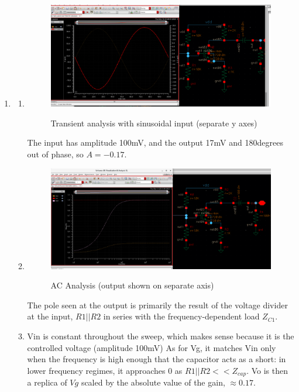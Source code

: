 \documentclass{article}
\begin{document}
\begin{prob}
\begin{enumerate}
\item
	\begin{enumerate}
		\item \begin{figure}[h]
			\includegraphics[width =\textwidth]{hw4 files/p1transanalysis.png}
			\label{transanal}
			\caption{Transient analysis with sinusoidal input (separate y axes)}
		\end{figure}
	The input has amplitude 100mV, and the output 17mV and 180degrees out of phase, so $A=-0.17$.	
\item
	\begin{figure}[h]
		\includegraphics[width =\textwidth]{hw4 files/acanalysis3.png}
		\label{acanal}
		\caption{AC Analysis (output shown on separate axis)}
	\end{figure}
The pole seen at the output is primarily the result of the voltage divider at the input, $R1||R2$ in series with the frequency-dependent load $Z_{C1}$. 
\item Vin is constant throughout the sweep, which makes sense because it is the controlled voltage (amplitude 100mV)
	As for Vg, it matches Vin only when the frequency is high enough that the capacitor acts as a short: in lower frequency regimes, it approaches 0 as $R1||R2 << Z_{cap}$.
	Vo is then a replica of $Vg$ scaled by the absolute value of the gain, $\approx0.17$.
	\end{enumerate}
	\end{enumerate}
\end{prob}
\end{document}
